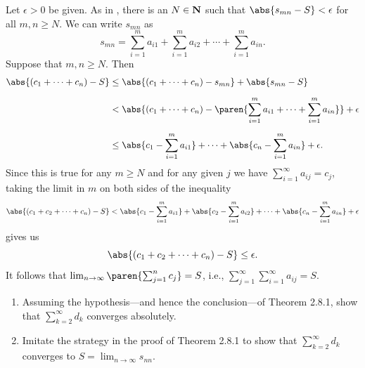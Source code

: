 \documentclass{lew98_solutions}
\begin{document}
\begin{solution}
\begin{enumerate}
        Let \( \epsilon > 0 \) be given. As in , there is an \( N \in \mathbf{N} \) such that \( \abs{s_{mn} - S} < \epsilon \) for all \( m, n \geq N \). We can write \( s_{mn} \) as
        \[
            s_{mn} = \sum_{i=1}^m a_{i1} + \sum_{i=1}^m a_{i2} + \cdots + \sum_{i=1}^m a_{in}.
        \]
        Suppose that \( m, n \geq N \). Then
        \begin{align*}
            \abs{(c_1 + \cdots + c_n) - S} &\leq \abs{(c_1 + \cdots + c_n) - s_{mn}} + \abs{s_{mn} - S} \\[2mm]
            &< \abs{(c_1 + \cdots + c_n) - \paren{ \sum_{i=1}^m a_{i1} + \cdots + \sum_{i=1}^m a_{in} }} + \epsilon \\[2mm]
            &\leq \abs{c_1 - \sum_{i=1}^m a_{i1}} + \cdots + \abs{c_n - \sum_{i=1}^m a_{in}} + \epsilon.
        \end{align*}
        Since this is true for any \( m \geq N \) and for any given \( j \) we have \( \sum_{i=1}^{\infty} a_{ij} = c_j \), taking the limit in \( m \) on both sides of the inequality
        \[
            \abs{(c_1 + c_2 + \cdots + c_n) - S} < \abs{c_1 - \sum_{i=1}^m a_{i1}} + \abs{c_2 - \sum_{i=1}^m a_{i2}} + \cdots + \abs{c_n - \sum_{i=1}^m a_{in}} + \epsilon
        \]
        gives us
        \[
            \abs{(c_1 + c_2 + \cdots + c_n) - S} \leq \epsilon.
        \]
        It follows that \( \lim_{n \to \infty} \paren{ \sum_{j=1}^n c_j } = S \), i.e., \( \sum_{j=1}^{\infty} \sum_{i=1}^{\infty} a_{ij} = S \).
    \end{enumerate}
\end{solution}

\begin{exercise}
\label{ex:2.8.6}
    \begin{enumerate}
        \item Assuming the hypothesis---and hence the conclusion---of Theorem 2.8.1, show that \( \sum_{k=2}^{\infty} d_k \) converges absolutely.

        \item Imitate the strategy in the proof of Theorem 2.8.1 to show that \( \sum_{k=2}^{\infty} d_k \) converges to \( S = \lim_{n \to \infty} s_{nn} \).
    \end{enumerate}
\end{exercise}
\end{document}
